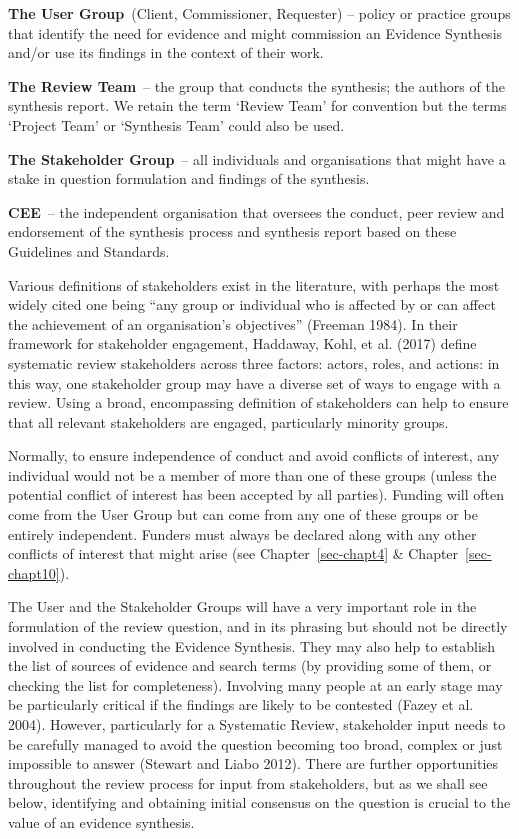 \documentclass[
  letterpaper,
  DIV=11,
  numbers=noendperiod]{scrreprt}
\begin{document}
\textbf{The User Group}~(Client, Commissioner, Requester) -- policy or
practice groups that identify the need for evidence and might commission
an Evidence Synthesis and/or use its findings in the context of their
work.

\textbf{The Review Team}~-- the group that conducts the synthesis; the
authors of the synthesis report. We retain the term `Review Team' for
convention but the terms `Project Team' or `Synthesis Team' could also
be used.

\textbf{The Stakeholder Group}~-- all individuals and organisations that
might have a stake in question formulation and findings of the
synthesis.

\textbf{CEE}~-- the independent organisation that oversees the conduct,
peer review and endorsement of the synthesis process and synthesis
report based on these Guidelines and Standards.

Various definitions of stakeholders exist in the literature, with
perhaps the most widely cited one being ``any group or individual who is
affected by or can affect the achievement of an organisation's
objectives'' (Freeman 1984). In their framework for stakeholder
engagement, Haddaway, Kohl, et al. (2017) define systematic review
stakeholders across three factors: actors, roles, and actions: in this
way, one stakeholder group may have a diverse set of ways to engage with
a review. Using a broad, encompassing definition of stakeholders can
help to ensure that all relevant stakeholders are engaged, particularly
minority groups.

Normally, to ensure independence of conduct and avoid conflicts of
interest, any individual would not be a member of more than one of these
groups (unless the potential conflict of interest has been accepted by
all parties). Funding will often come from the User Group but can come
from any one of these groups or be entirely independent. Funders must
always be declared along with any other conflicts of interest that might
arise (see Chapter~\ref{sec-chapt4} \& Chapter~\ref{sec-chapt10}).

The User and the Stakeholder Groups will have a very important role in
the formulation of the review question, and in its phrasing but should
not be directly involved in conducting the Evidence Synthesis. They may
also help to establish the list of sources of evidence and search terms
(by providing some of them, or checking the list for completeness).
Involving many people at an early stage may be particularly critical if
the findings are likely to be contested (Fazey et al. 2004). However,
particularly for a Systematic Review, stakeholder input needs to be
carefully managed to avoid the question becoming too broad, complex or
just impossible to answer (Stewart and Liabo 2012). There are further
opportunities throughout the review process for input from stakeholders,
but as we shall see below, identifying and obtaining initial consensus
on the question is crucial to the value of an evidence synthesis.
\end{document}
